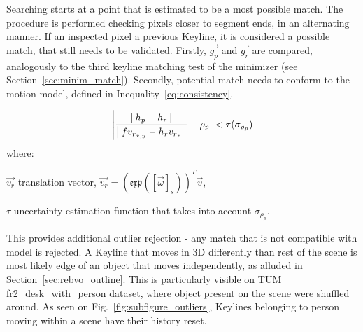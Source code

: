 Searching starts at a point that is estimated to be a most possible match. The procedure is performed checking pixels closer to segment ends, in an alternating manner. If an inspected pixel a previous Keyline, it is considered a possible match, that still needs to be validated. Firstly, $\vec{g_p}$ and $\vec{g_r}$ are compared, analogously to the third keyline matching test of the minimizer (see Section~\ref{sec:minim_match}). Secondly, potential match needs to conform to the motion model, defined in Inequality~\ref{eq:consistency}.

\begin{equation}
\abs* {\frac{\norm*{h_p - h_r}}{\norm*{fv_{r_{x,y}}-h_{r}v_{r_z}} }-\rho_{p}} < \tau(\sigma_{\rho_{p}})
\label{eq:consistency}
\end{equation}
where:
\begin{eqwhere}[2cm]
	\item[$\vec{v_r}$] translation vector, $\vec{v_r} = \left( \mathfrak{exp} \left ( \left[ \vec{\omega} \right ]_{s} \right ) \right) ^T \vec{v}$,
	\item[$\tau$] uncertainty estimation function that takes into account $\sigma_{\rho_{p}}$.
\end{eqwhere}

This provides additional outlier rejection - any match that is not compatible with model is rejected. A Keyline that moves in 3D differently than rest of the scene is most likely edge of an object that moves independently, as alluded in Section~\ref{sec:rebvo_outline}. This is particularly visible on TUM fr2\_desk\_with\_person dataset, where object present on the scene were shuffled around. As seen on Fig.~\ref{fig:subfigure_outliers}, Keylines belonging to person moving within a scene have their history reset.

